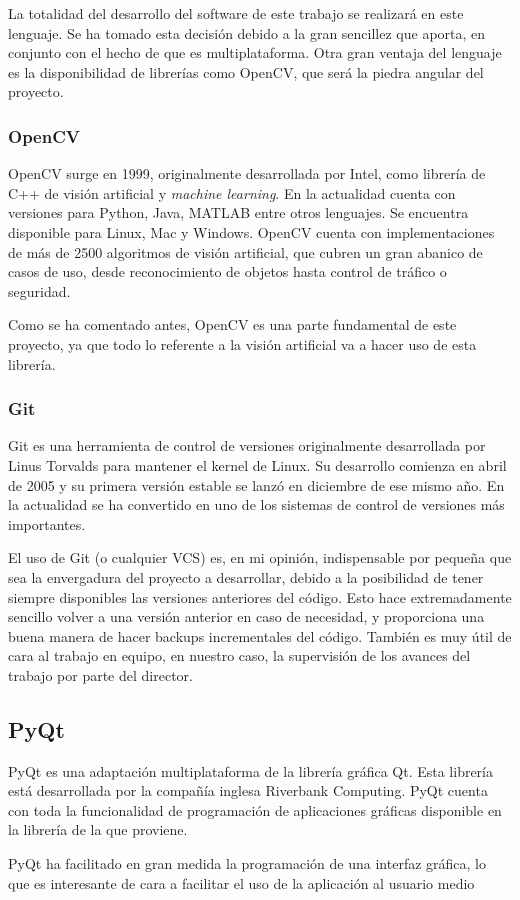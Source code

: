 La totalidad del desarrollo del software de este trabajo se realizará en este lenguaje. Se ha tomado esta decisión debido a la gran sencillez que aporta, en conjunto con el hecho de que es multiplataforma. Otra gran ventaja del lenguaje es la disponibilidad de librerías como OpenCV, que será la piedra angular del proyecto. 

\subsubsection*{OpenCV}
OpenCV surge en 1999, originalmente desarrollada por Intel, como librería de C++ de visión artificial y \textit{machine learning}. En la actualidad cuenta con versiones para Python, Java, MATLAB entre otros lenguajes. Se encuentra disponible para Linux, Mac y Windows. OpenCV cuenta con implementaciones de más de 2500 algoritmos de visión artificial, que cubren un gran abanico de casos de uso, desde reconocimiento de objetos hasta control de tráfico o seguridad.

Como se ha comentado antes, OpenCV es una parte fundamental de este proyecto, ya que todo lo referente a la visión artificial va a hacer uso de esta librería.

\subsubsection*{Git}
Git es una herramienta de control de versiones originalmente desarrollada por Linus Torvalds para mantener el kernel de Linux. Su desarrollo comienza en abril de 2005 y su primera versión estable se lanzó en diciembre de ese mismo año. En la actualidad se ha convertido en uno de los sistemas de control de versiones más importantes.

El uso de Git (o cualquier VCS) es, en mi opinión, indispensable por pequeña que sea la envergadura del proyecto a desarrollar, debido a la posibilidad de tener siempre disponibles las versiones anteriores del código. Esto hace extremadamente sencillo volver a una versión anterior en caso de necesidad, y proporciona una buena manera de hacer backups incrementales del código. También es muy útil de cara al trabajo en equipo, en nuestro caso, la supervisión de los avances del trabajo por parte del director.

\subsection*{PyQt}
PyQt es una adaptación multiplataforma de la librería gráfica Qt. Esta librería está desarrollada por la compañía inglesa Riverbank Computing. PyQt cuenta con toda la funcionalidad de programación de aplicaciones gráficas disponible en la librería de la que proviene.

PyQt ha facilitado en gran medida la programación de una interfaz gráfica, lo que es interesante de cara a facilitar el uso de la aplicación al usuario medio